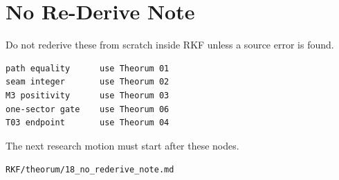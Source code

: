 \hypertarget{no-re-derive-note}{%
\chapter{No Re-Derive Note}\label{no-re-derive-note}}

Do not rederive these from scratch inside RKF unless a source error is found.

\begin{verbatim}
path equality      use Theorum 01
seam integer       use Theorum 02
M3 positivity      use Theorum 03
one-sector gate    use Theorum 06
T03 endpoint       use Theorum 04
\end{verbatim}

The next research motion must start after these nodes.

\begin{flushright}\small\texttt{RKF/theorum/18\_no\_rederive\_note.md}\end{flushright}
